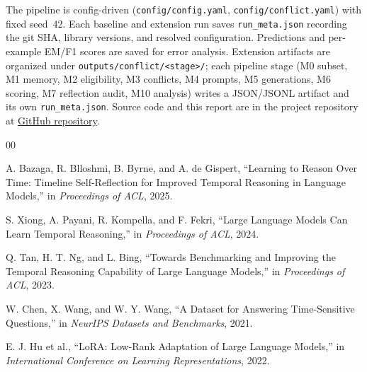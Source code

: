 \documentclass[conference]{IEEEtran}
\begin{document}
The pipeline is config-driven (\texttt{config/config.yaml}, \texttt{config/conflict.yaml}) with fixed seed~42. Each baseline and extension run saves \texttt{run\_meta.json} recording the git SHA, library versions, and resolved configuration. Predictions and per-example EM/F1 scores are saved for error analysis. Extension artifacts are organized under \texttt{outputs/conflict/<stage>/}; each pipeline stage (M0 subset, M1 memory, M2 eligibility, M3 conflicts, M4 prompts, M5 generations, M6 scoring, M7 reflection audit, M10 analysis) writes a JSON/JSONL artifact and its own \texttt{run\_meta.json}. Source code and this report are in the project repository at \href{https://github.com/thestbobo/tiser_temporal_reasoning_extension}{GitHub repository}.

\begin{thebibliography}{00}

A. Bazaga, R. Blloshmi, B. Byrne, and A. de Gispert,
``Learning to Reason Over Time: Timeline Self-Reflection for Improved Temporal Reasoning in Language Models,''
in \emph{Proceedings of ACL}, 2025.

S. Xiong, A. Payani, R. Kompella, and F. Fekri,
``Large Language Models Can Learn Temporal Reasoning,''
in \emph{Proceedings of ACL}, 2024.

Q. Tan, H. T. Ng, and L. Bing,
``Towards Benchmarking and Improving the Temporal Reasoning Capability of Large Language Models,''
in \emph{Proceedings of ACL}, 2023.

W. Chen, X. Wang, and W. Y. Wang,
``A Dataset for Answering Time-Sensitive Questions,''
in \emph{NeurIPS Datasets and Benchmarks}, 2021.

E. J. Hu et al.,
``LoRA: Low-Rank Adaptation of Large Language Models,''
in \emph{International Conference on Learning Representations}, 2022.

\end{thebibliography}
\end{document}

